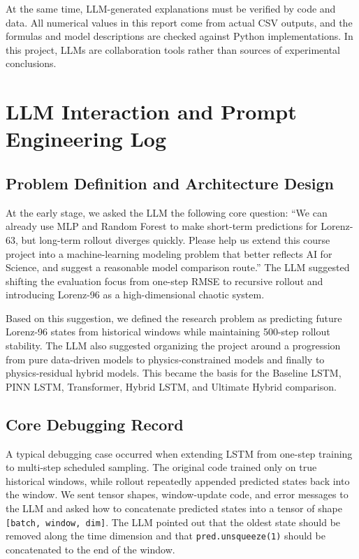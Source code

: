 \documentclass[a4paper,12pt]{article}
\begin{document}
At the same time, LLM-generated explanations must be verified by code and data. All numerical values in this report come from actual CSV outputs, and the formulas and model descriptions are checked against Python implementations. In this project, LLMs are collaboration tools rather than sources of experimental conclusions.

\appendix

\section{LLM Interaction and Prompt Engineering Log}

\subsection{Problem Definition and Architecture Design}

At the early stage, we asked the LLM the following core question: ``We can already use MLP and Random Forest to make short-term predictions for Lorenz-63, but long-term rollout diverges quickly. Please help us extend this course project into a machine-learning modeling problem that better reflects AI for Science, and suggest a reasonable model comparison route.'' The LLM suggested shifting the evaluation focus from one-step RMSE to recursive rollout and introducing Lorenz-96 as a high-dimensional chaotic system.

Based on this suggestion, we defined the research problem as predicting future Lorenz-96 states from historical windows while maintaining 500-step rollout stability. The LLM also suggested organizing the project around a progression from pure data-driven models to physics-constrained models and finally to physics-residual hybrid models. This became the basis for the Baseline LSTM, PINN LSTM, Transformer, Hybrid LSTM, and Ultimate Hybrid comparison.

\subsection{Core Debugging Record}

A typical debugging case occurred when extending LSTM from one-step training to multi-step scheduled sampling. The original code trained only on true historical windows, while rollout repeatedly appended predicted states back into the window. We sent tensor shapes, window-update code, and error messages to the LLM and asked how to concatenate predicted states into a tensor of shape \texttt{[batch, window, dim]}. The LLM pointed out that the oldest state should be removed along the time dimension and that \texttt{pred.unsqueeze(1)} should be concatenated to the end of the window.
\end{document}
